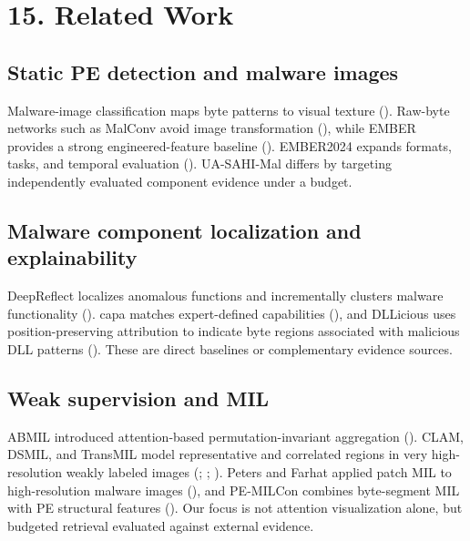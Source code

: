 \documentclass[
  10pt,
]{article}
\begin{document}
\section{15. Related Work}\label{related-work}

\subsection{Static PE detection and malware
images}\label{static-pe-detection-and-malware-images}

Malware-image classification maps byte patterns to visual texture
(). Raw-byte
networks such as MalConv avoid image transformation
(), while EMBER provides
a strong engineered-feature baseline
(). EMBER2024
expands formats, tasks, and temporal evaluation
(). UA-SAHI-Mal
differs by targeting independently evaluated component evidence under a
budget.

\subsection{Malware component localization and
explainability}\label{malware-component-localization-and-explainability}

DeepReflect localizes anomalous functions and incrementally clusters
malware functionality (). capa matches expert-defined capabilities
(), and
DLLicious uses position-preserving attribution to indicate byte regions
associated with malicious DLL patterns
(). These
are direct baselines or complementary evidence sources.

\subsection{Weak supervision and MIL}\label{weak-supervision-and-mil}

ABMIL introduced attention-based permutation-invariant aggregation
(). CLAM,
DSMIL, and TransMIL model representative and correlated regions in very
high-resolution weakly labeled images (; ;
). Peters and Farhat
applied patch MIL to high-resolution malware images
(), and
PE-MILCon combines byte-segment MIL with PE structural features
(). Our focus
is not attention visualization alone, but budgeted retrieval evaluated
against external evidence.
\end{document}
